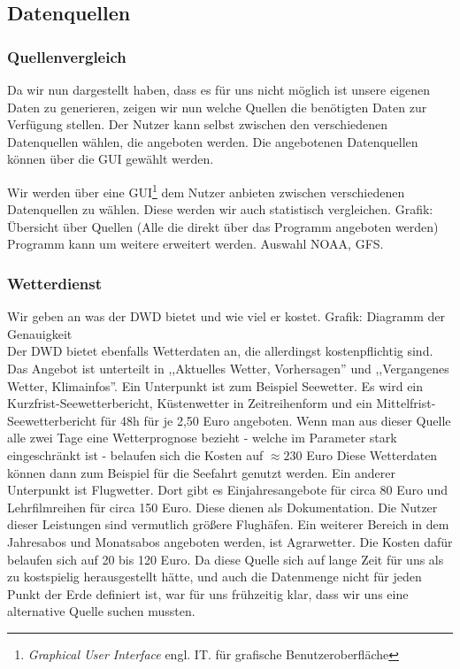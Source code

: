 \documentclass[a4paper,oneside,12pt,titlepage]{article}
\begin{document}
\subsection{Datenquellen} %

\subsubsection{Quellenvergleich} %
Da wir nun dargestellt haben, dass es für uns nicht möglich ist unsere eigenen Daten zu generieren, zeigen wir nun welche Quellen die benötigten Daten zur Verfügung stellen. Der Nutzer kann selbst zwischen den verschiedenen Datenquellen wählen, die angeboten werden. Die angebotenen Datenquellen können über die GUI gewählt werden.

Wir werden über eine GUI\footnote{\textit{Graphical User Interface} engl. IT. für grafische Benutzeroberfläche} dem Nutzer anbieten zwischen verschiedenen Datenquellen zu wählen. Diese werden wir auch statistisch vergleichen.
Grafik: Übersicht über Quellen (Alle die direkt über das Programm angeboten werden)
Programm kann um weitere erweitert werden.
Auswahl NOAA, GFS.\cite{noaa}


\subsubsection*{Wetterdienst} %
Wir geben an was der DWD bietet und wie viel er kostet.
Grafik: Diagramm der Genauigkeit \\
Der DWD bietet ebenfalls Wetterdaten an, die allerdingst kostenpflichtig sind. Das Angebot ist unterteilt in ,,Aktuelles Wetter, Vorhersagen'' und ,,Vergangenes Wetter, Klimainfos''. Ein Unterpunkt ist zum Beispiel Seewetter. Es wird ein Kurzfrist-Seewetterbericht, Küstenwetter in Zeitreihenform und ein Mittelfrist-Seewetterbericht für 48h für je 2,50 Euro angeboten. Wenn man aus dieser Quelle alle zwei Tage eine Wetterprognose bezieht - welche im Parameter stark eingeschränkt ist - belaufen sich die Kosten auf $\approx 230$ Euro Diese Wetterdaten können dann zum Beispiel für die Seefahrt genutzt werden. Ein anderer Unterpunkt ist Flugwetter. Dort gibt es Einjahresangebote für circa 80 Euro und Lehrfilmreihen für circa 150 Euro. Diese dienen als Dokumentation. Die Nutzer dieser Leistungen sind vermutlich größere Flughäfen. Ein weiterer Bereich in dem Jahresabos und Monatsabos angeboten werden, ist Agrarwetter. Die Kosten dafür belaufen sich auf 20 bis 120 Euro.
\cite{dwd-shop}
Da diese Quelle sich auf lange Zeit für uns als zu kostspielig herausgestellt hätte, und auch die Datenmenge nicht für jeden Punkt der Erde definiert ist, war für uns frühzeitig klar, dass wir uns eine alternative Quelle suchen mussten.  
\end{document}
